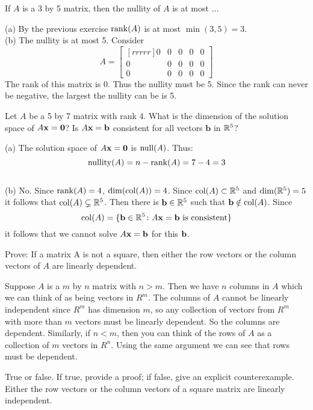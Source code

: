 \ii If $A$ is a 3 by 5 matrix, then the nullity of $A$ is at most $\dots$
\ee
\begin{solution}
\noindent
(a) By the previous exercise  $\operatorname{rank}(A)$ is at most $\min(3,5) = 3$. 
\\
(b) 
The nullity is at most 5. Consider
$$A =
\begin{bmatrix}[rrrrr]
0&0&0&0&0\\
0&0&0&0&0\\
0&0&0&0&0
\end{bmatrix}
$$
The rank of this matrix is 0. Thus the nullity must be 5. Since the rank can never be negative, the largest the nullity can be is 5.
\end{solution}
\ii Let $A$ be a 5 by 7 matrix with rank 4.
\bb
\ii What is the dimension of the solution space of $A{\mathbf x} = \textbf{0}$?
\ii Is $A{\mathbf x} = \textbf{b}$ consistent for all vectors $\textbf{b}$ in ${\mathbb R}^5$?
\ee
\begin{solution}
\noindent (a) The solution space of $A{\mathbf x} = \textbf{0}$ is $\operatorname{null}(A)$. Thus:
$$
\operatorname{nullity}(A) =n- \operatorname{rank}(A) = 7 - 4 = 3
$$
\\
(b) No. Since $\operatorname{rank}(A)=4$, $\dim(\operatorname{col}(A))=4$. Since $\operatorname{col}(A)\subset{\mathbb R}^5$ and $\dim({\mathbb R}^5)=5$ it follows that $\operatorname{col}(A)\subsetneq {\mathbb R}^5$. Then there is ${\mathbf b}\in{\mathbb R}^5$ such that ${\mathbf b}\notin\operatorname{col}(A)$. Since 
\[
\operatorname{col}(A)=\{{\mathbf b}\in{\mathbb R}^5\colon A{\mathbf x}={\mathbf b} \text{ is consistent}\}
\]
it follows that we cannot solve $A{\mathbf x}={\mathbf b}$ for this ${\mathbf b}$. 
\end{solution}
\ii \label{ex:rowscolumns} Prove: If a matrix A is not a square, then either the row vectors or the column vectors of $A$ are linearly dependent.
\\
\begin{solution}
\noindent Suppose $A$ is a $m$ by $n$ matrix with $n>m$. Then we have $n$ columns in $A$ which we can think of as being vectors in $R^m$. The columns of $A$ cannot be linearly independent since $R^m$ has dimension $m$, so any collection of vectors from $R^m$ with more than $m$ vectors must be linearly dependent. So the columns are dependent. Similarly, if $n<m$, then you can think of the rows of $A$ as a collection of $m$ vectors in $R^n$. Using the same argument we can see that rows must be dependent.
\end{solution}
\ii True or false. If true, provide a proof; if false, give an explicit counterexample. 
\bb
\ii Either the row vectors or the column vectors of a square matrix are linearly independent.


